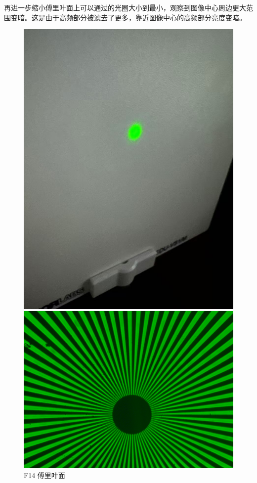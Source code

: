 \documentclass{ctexart}
\begin{document}
再进一步缩小傅里叶面上可以通过的光圈大小到最小，观察到图像中心周边更大范围变暗。这是由于高频部分被滤去了更多，靠近图像中心的高频部分亮度变暗。
\begin{figure}[H]
  \centering
  \begin{minipage}[b]{0.2\textwidth}
    \centering
    \includegraphics[width=\textwidth]{pictures/微信图片_20241017164907.jpg}
    \caption{F14 傅里叶面}
  \end{minipage}
  \hspace{0.1\textwidth} %
  \begin{minipage}[b]{0.3\textwidth}
    \centering
    \includegraphics[width=\textwidth]{pictures/F14-mask2-Ex22.png}

\end{minipage}
\end{figure}
\end{document}
